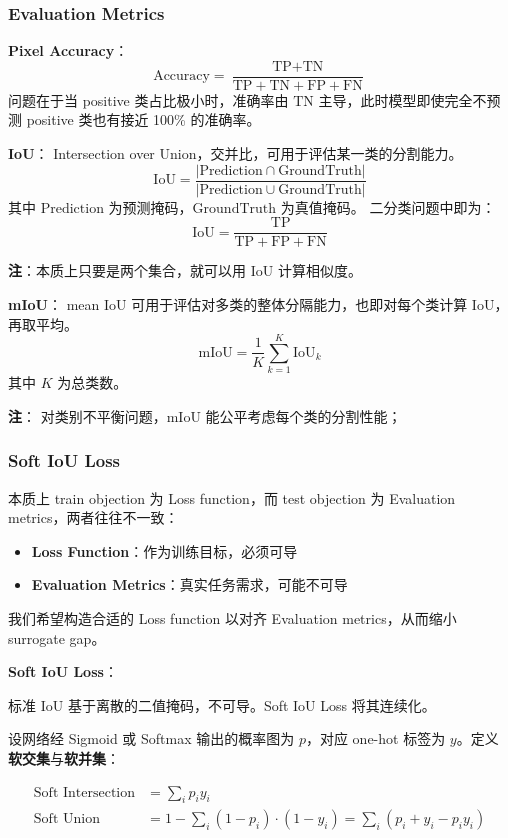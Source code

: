 \subsubsection{Evaluation Metrics}\label{evaluation-metrics}

\textbf{Pixel Accuracy}： \[
\text{Accuracy} = \dfrac{\text{TP}+\text{TN}}{\text{TP}+\text{TN}+\text{FP}+\text{FN}}
\] 问题在于当 positive 类占比极小时，准确率由 \(\text{TN}\)
主导，此时模型即使完全不预测 positive 类也有接近 100\% 的准确率。

\textbf{IoU}： Intersection over
Union，交并比，可用于评估某一类的分割能力。 \[
\text{IoU} = \frac{ | \text{Prediction} \cap \text{GroundTruth} | }{ | \text{Prediction} \cup \text{GroundTruth} | }
\] 其中 \(\text{Prediction}\) 为预测掩码，\(\text{GroundTruth}\)
为真值掩码。 二分类问题中即为： \[
\text{IoU} = \frac{\text{TP}}{\text{TP} + \text{FP} + \text{FN}}
\]

\textbf{注}：本质上只要是两个集合，就可以用 IoU 计算相似度。

\textbf{mIoU}： mean IoU
可用于评估对多类的整体分隔能力，也即对每个类计算 IoU，再取平均。 \[
\text{mIoU} = \frac{1}{K} \sum_{k=1}^{K} \text{IoU}_k
\] 其中 \(K\) 为总类数。

\textbf{注}： 对类别不平衡问题，mIoU 能公平考虑每个类的分割性能；

\subsubsection{Soft IoU Loss}\label{soft-iou-loss}

本质上 train objection 为 Loss function，而 test objection 为 Evaluation
metrics，两者往往不一致：

\begin{itemize}
\tightlist
\item
  \textbf{Loss Function}：作为训练目标，必须可导
\item
  \textbf{Evaluation Metrics}：真实任务需求，可能不可导
\end{itemize}

我们希望构造合适的 Loss function 以对齐 Evaluation metrics，从而缩小
surrogate gap。

\textbf{Soft IoU Loss}：

标准 IoU 基于离散的二值掩码，不可导。Soft IoU Loss 将其连续化。

设网络经 Sigmoid 或 Softmax 输出的概率图为 \(p\)，对应 one-hot 标签为
\(y\)。定义\textbf{软交集}与\textbf{软并集}：

\[
\begin{aligned}
\text{Soft Intersection} &= \sum_i p_i y_i \\
\text{Soft Union} &= 1 - \sum_i (1 - p_i)\cdot(1 - y_i) = \sum_i (p_i + y_i - p_i y_i)
\end{aligned}
\]


